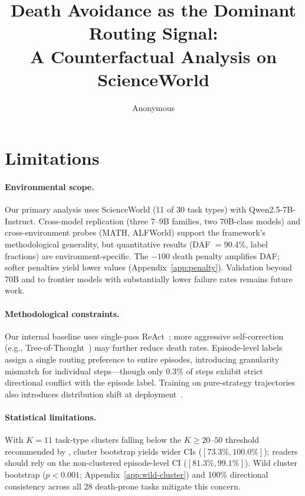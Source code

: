 \documentclass[11pt]{article}
\title{Death Avoidance as the Dominant Routing Signal:\\A Counterfactual Analysis on ScienceWorld}
\author{Anonymous}
\begin{document}
\maketitle









\section*{Limitations}

\paragraph{Environmental scope.}
Our primary analysis uses ScienceWorld (11 of 30 task types) with Qwen2.5-7B-Instruct. Cross-model replication (three 7--9B families, two 70B-class models) and cross-environment probes (MATH, ALFWorld) support the framework's methodological generality, but quantitative results (DAF $= 90.4\%$, label fractions) are environment-specific. The $-100$ death penalty amplifies DAF; softer penalties yield lower values (Appendix~\ref{app:penalty}). Validation beyond 70B and to frontier models with substantially lower failure rates remains future work.

\paragraph{Methodological constraints.}
Our internal baseline uses single-pass ReAct~\citep{react-2023}; more aggressive self-correction (e.g., Tree-of-Thought~\citep{tot-2023}) may further reduce death rates. Episode-level labels assign a single routing preference to entire episodes, introducing granularity mismatch for individual steps---though only 0.3\% of steps exhibit strict directional conflict with the episode label. Training on pure-strategy trajectories also introduces distribution shift at deployment~\citep{dagger-2011}.

\paragraph{Statistical limitations.}
With $K{=}11$ task-type clusters falling below the $K \geq 20$--$50$ threshold recommended by \citet{cameron-2008,webb-2023}, cluster bootstrap yields wider CIs ($[73.3\%, 100.0\%]$); readers should rely on the non-clustered episode-level CI ($[81.3\%, 99.1\%]$). Wild cluster bootstrap ($p < 0.001$; Appendix~\ref{app:wild-cluster}) and 100\% directional consistency across all 28 death-prone tasks mitigate this concern.
\end{document}
